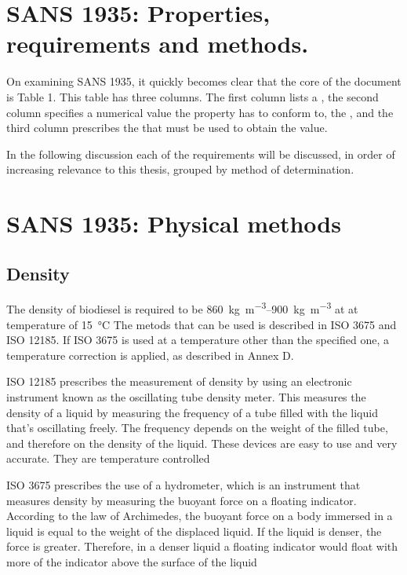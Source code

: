 \section{SANS 1935: Properties, requirements and methods.}

On examining SANS 1935, it quickly becomes clear that the core of the document
is Table 1. This table has three columns. The first column lists a
, the second column specifies a numerical value the property
has to conform to, the , and the third column prescribes
the  that must be used to obtain the value.

In the following discussion each of the requirements will be discussed, in order
of increasing relevance to this thesis, grouped by method of determination.

\section{SANS 1935: Physical methods}

\subsection{Density}

The density of biodiesel is required to be
\SIrange{860}{900}{\kilogram\per\cubic\metre} at at temperature of
\SI{15}{\celsius} The metods that can be used is described in ISO 3675 and ISO
12185. If ISO 3675 is used at a temperature other than the specified one, a
temperature correction is applied, as described in Annex D.

ISO 12185 prescribes the measurement of density by using an electronic
instrument known as the oscillating tube density meter. This measures the
density of a liquid by measuring the frequency of a tube filled with the liquid
that's oscillating freely. The frequency depends on the weight of the filled
tube, and therefore on the density of the liquid. These devices are easy to use
and very accurate. They are temperature controlled

ISO 3675 prescribes the use of a hydrometer, which is an instrument that
measures density by measuring the buoyant force on a floating indicator.
According to the law of Archimedes, the buoyant force on a body immersed in a
liquid is equal to the weight of the displaced liquid. If the liquid is denser,
the force is greater. Therefore, in a denser liquid a floating indicator would
float with more of the indicator above the surface of the liquid

